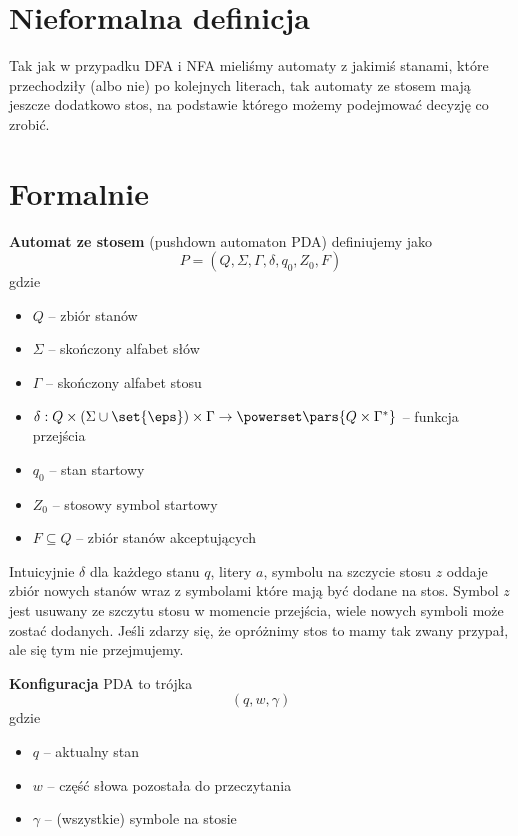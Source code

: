 \section{Nieformalna definicja}
Tak jak w przypadku DFA i NFA mieliśmy automaty z jakimiś stanami, które przechodziły (albo nie) po kolejnych literach, tak automaty ze stosem mają jeszcze dodatkowo stos, na podstawie którego możemy podejmować decyzję co zrobić.

\section{Formalnie}
\begin{definition}
    \textbf{Automat ze stosem} (pushdown automaton PDA) definiujemy jako
    \[
        P = (Q, \Sigma, \Gamma, \delta, q_0, Z_0, F)
    \]
    gdzie
    \begin{itemize}
        \item \( Q \) -- zbiór stanów
        \item \( \Sigma \) -- skończony alfabet słów
        \item \( \Gamma \) -- skończony alfabet stosu
        \item \( \delta : Q \times (\Sigma \cup \set{\eps}) \times \Gamma \rightarrow \powerset\pars{Q \times \Gamma^*} \) -- funkcja przejścia
        \item \( q_0 \) -- stan startowy
        \item \( Z_0\) -- stosowy symbol startowy
        \item \( F \subseteq Q \) -- zbiór stanów akceptujących
    \end{itemize}
\end{definition}
Intuicyjnie \( \delta \) dla każdego stanu \( q \), litery \( a \), symbolu na szczycie stosu \( z \) oddaje zbiór nowych stanów wraz z symbolami które mają być dodane na stos.
Symbol \( z \) jest usuwany ze szczytu stosu w momencie przejścia, wiele nowych symboli może zostać dodanych.
Jeśli zdarzy się, że opróżnimy stos to mamy tak zwany przypał, ale się tym nie przejmujemy.

\begin{definition}
    \textbf{Konfiguracja} PDA to trójka
    \[
        (q, w, \gamma)
    \]
    gdzie
    \begin{itemize}
        \item \( q \) -- aktualny stan
        \item \( w \) -- część słowa pozostała do przeczytania
        \item \( \gamma \) -- (wszystkie) symbole na stosie
    \end{itemize}
\end{definition}

